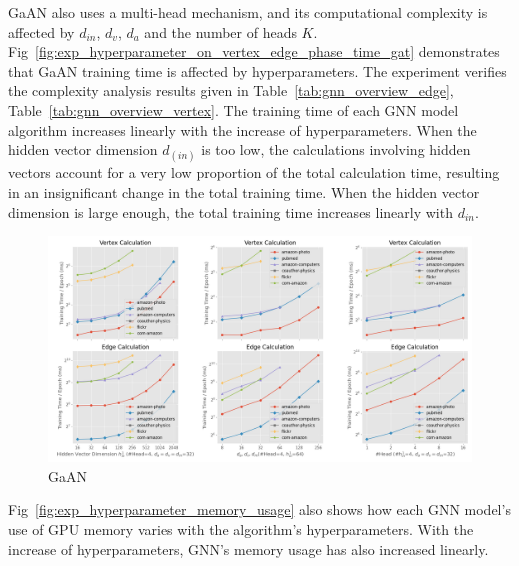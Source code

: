 GaAN also uses a multi-head mechanism, and its computational complexity is affected by $d_{in}$, $d_v$, $d_a$ and the number of heads $K$.
Fig~\ref{fig:exp_hyperparameter_on_vertex_edge_phase_time_gat} demonstrates that GaAN training time is affected by hyperparameters.
The experiment verifies the complexity analysis results given in Table~\ref{tab:gnn_overview_edge}, Table~\ref{tab:gnn_overview_vertex}. The training time of each GNN model algorithm increases linearly with the increase of hyperparameters.
When the hidden vector dimension $d_(in)$ is too low, the calculations involving hidden vectors account for a very low proportion of the total calculation time, resulting in an insignificant change in the total training time.
When the hidden vector dimension is large enough, the total training time increases linearly with $d_{in}$.

\begin{figure}
    \centering
    \includegraphics[width=0.7\columnwidth]{figs/experiments/exp_hyperparameter_on_vertex_edge_phase_time_gaan.png}
    \caption{GaAN}
    \label{fig:exp_hyperparameter_on_vertex_edge_phase_time_gaan}
\end{figure}

Fig~\ref{fig:exp_hyperparameter_memory_usage} also shows how each GNN model's use of GPU memory varies with the algorithm's hyperparameters.
With the increase of hyperparameters, GNN's memory usage has also increased linearly.

